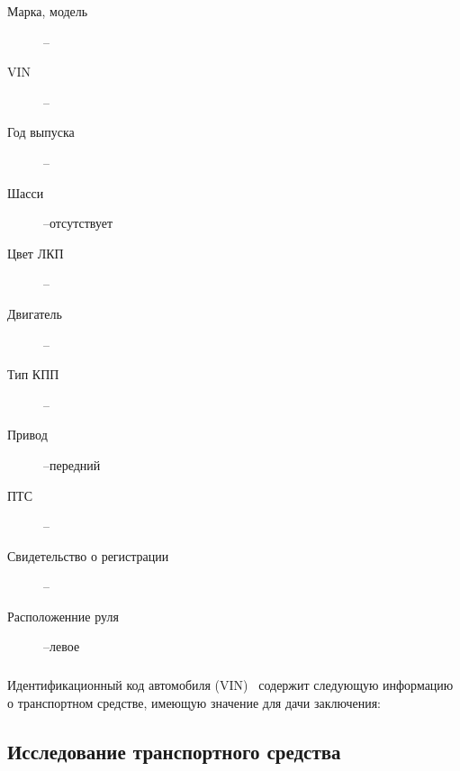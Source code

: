 \begin{description}
   \item[Марка, модель] --
   \item[VIN] -- \vin
   \item[Год выпуска] --
   \item[Шасси] --отсутствует
   \item[Цвет ЛКП] --
   \item[Двигатель] --
   \item[Тип КПП] --
   \item[Привод] --передний
   \item[ПТС] --
   \item[Свидетельство о регистрации] --
   \item[Расположенние руля] --левое
\end{description}

\subparagraph*{} Идентификационный код автомобиля (VIN) \vin\, содержит следующую информацию о транспортном средстве, имеющую значение для 	дачи заключения:



\subsection{Исследование транспортного средства}

